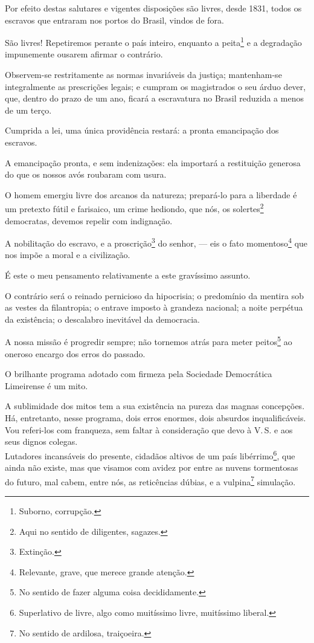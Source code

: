 Por efeito destas salutares e vigentes disposições são livres, desde
1831, todos os escravos que entraram nos portos do Brasil, vindos de
fora.

São livres! Repetiremos perante o país inteiro, enquanto a
peita\footnote{Suborno, corrupção.} e a degradação impunemente ousarem
afirmar o contrário.

Observem-se restritamente as normas invariáveis da justiça; mantenham-se
integralmente as prescrições legais; e cumpram os magistrados o seu
árduo dever, que, dentro do prazo de um ano, ficará a escravatura no
Brasil reduzida a menos de um terço.

Cumprida a lei, uma única providência restará: a pronta emancipação dos
escravos.

A emancipação pronta, e sem indenizações: ela importará a restituição
generosa do que os nossos avós roubaram com usura.

O homem emergiu livre dos arcanos da natureza; prepará-lo para a
liberdade é um pretexto fútil e farisaico, um crime hediondo, que nós,
os solertes\footnote{Aqui no sentido de diligentes, sagazes.}
democratas, devemos repelir com indignação.

A nobilitação do escravo, e a proscrição\footnote{Extinção.} do
senhor, --- eis o fato momentoso\footnote{Relevante, grave, que merece
  grande atenção.} que nos impõe a moral e a civilização.

É este o meu pensamento relativamente a este gravíssimo assunto.

O contrário será o reinado pernicioso da hipocrisia; o predomínio da
mentira sob as vestes da filantropia; o entrave imposto à grandeza
nacional; a noite perpétua da existência; o descalabro inevitável da
democracia.

A nossa missão é progredir sempre; não tornemos atrás para meter
peitos\footnote{No sentido de fazer alguma coisa decididamente.} ao
oneroso encargo dos erros do passado.

O brilhante programa adotado com firmeza pela Sociedade Democrática
Limeirense é um mito.

A sublimidade dos mitos tem a sua existência na pureza das magnas
concepções.\\
Há, entretanto, nesse programa, dois erros enormes, dois absurdos
inqualificáveis.\\
Vou referi-los com franqueza, sem faltar à consideração que devo à V.\,S.
e aos seus dignos colegas.\\
Lutadores incansáveis do presente, cidadãos altivos de um país
libérrimo\footnote{Superlativo de livre, algo como muitíssimo livre,
  muitíssimo liberal.}, que ainda não existe, mas que visamos com avidez
por entre as nuvens tormentosas do futuro, mal cabem, entre nós, as
reticências dúbias, e a vulpina\footnote{No sentido de ardilosa,
  traiçoeira.} simulação.

